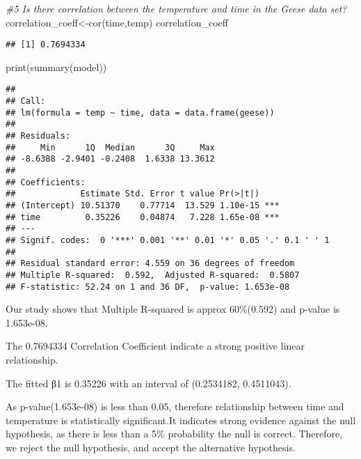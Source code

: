 \documentclass[
]{article}
\newenvironment{Shaded}{\begin{snugshade}}{\end{snugshade}}
\newcommand{\CommentTok}[1]{\textcolor[rgb]{0.56,0.35,0.01}{\textit{#1}}}
\newcommand{\FunctionTok}[1]{\textcolor[rgb]{0.00,0.00,0.00}{#1}}
\newcommand{\NormalTok}[1]{#1}
\newcommand{\OtherTok}[1]{\textcolor[rgb]{0.56,0.35,0.01}{#1}}
\begin{document}
\begin{Shaded}
\begin{Highlighting}[]
\CommentTok{\#5 Is there correlation between the temperature and time in the Geese data set?}
\NormalTok{correlation\_coeff}\OtherTok{\textless{}{-}}\FunctionTok{cor}\NormalTok{(time,temp)}
\NormalTok{correlation\_coeff}
\end{Highlighting}
\end{Shaded}

\begin{verbatim}
## [1] 0.7694334
\end{verbatim}

\begin{Shaded}
\begin{Highlighting}[]
\FunctionTok{print}\NormalTok{(}\FunctionTok{summary}\NormalTok{(model))}
\end{Highlighting}
\end{Shaded}

\begin{verbatim}
## 
## Call:
## lm(formula = temp ~ time, data = data.frame(geese))
## 
## Residuals:
##     Min      1Q  Median      3Q     Max 
## -8.6388 -2.9401 -0.2408  1.6338 13.3612 
## 
## Coefficients:
##             Estimate Std. Error t value Pr(>|t|)    
## (Intercept) 10.51370    0.77714  13.529 1.10e-15 ***
## time         0.35226    0.04874   7.228 1.65e-08 ***
## ---
## Signif. codes:  0 '***' 0.001 '**' 0.01 '*' 0.05 '.' 0.1 ' ' 1
## 
## Residual standard error: 4.559 on 36 degrees of freedom
## Multiple R-squared:  0.592,  Adjusted R-squared:  0.5807 
## F-statistic: 52.24 on 1 and 36 DF,  p-value: 1.653e-08
\end{verbatim}

Our study shows that Multiple R-squared is approx 60\%(0.592) and
p-value is 1.653e-08.

The 0.7694334 Correlation Coefficient indicate a strong positive linear
relationship.

The fitted β1 is 0.35226 with an interval of (0.2534182, 0.4511043).

As p-value(1.653e-08) is less than 0.05, therefore relationship between
time and temperature is statistically significant.It indicates strong
evidence against the null hypothesis, as there is less than a 5\%
probability the null is correct. Therefore, we reject the null
hypothesis, and accept the alternative hypothesis.
\end{document}
